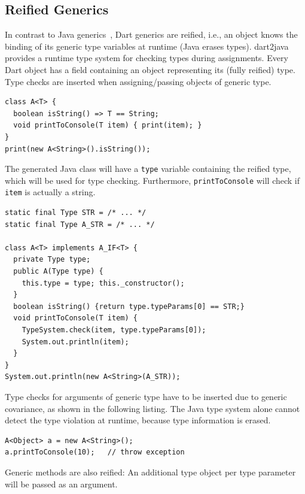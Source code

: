 \documentclass[sigplan,9pt]{acmart}
\begin{document}
\subsection{Reified Generics}
In contrast to Java generics~\cite{Bracha:1998:MFS:286936.286957}, Dart generics are reified, i.e., an object knows the binding of its generic type variables at runtime (Java erases types). dart2java provides a runtime type system for checking types during assignments. Every Dart object has a field containing an object representing its (fully reified) type. Type checks are inserted when assigning/passing objects of generic type. 

\begin{lstlisting}
class A<T> {
  boolean isString() => T == String;
  void printToConsole(T item) { print(item); }
}
print(new A<String>().isString());
\end{lstlisting}
The generated Java class will have a \texttt{type} variable containing the reified type, which will be used for type checking. Furthermore, \texttt{printToConsole} will check if \texttt{item} is actually a string. 
\begin{lstlisting}
static final Type STR = /* ... */
static final Type A_STR = /* ... */

class A<T> implements A_IF<T> {
  private Type type;
  public A(Type type) {
    this.type = type; this._constructor();
  }
  boolean isString() {return type.typeParams[0] == STR;}
  void printToConsole(T item) {
    TypeSystem.check(item, type.typeParams[0]);
    System.out.println(item);
  }
}
System.out.println(new A<String>(A_STR));
\end{lstlisting}
Type checks for arguments of generic type have to be inserted due to generic covariance, as shown in the following listing. The Java type system alone cannot detect the type violation at runtime, because type information is erased.
\begin{lstlisting}
A<Object> a = new A<String>();
a.printToConsole(10);	// throw exception
\end{lstlisting}
Generic methods are also reified: An additional type object per type parameter will be passed as an argument.
\end{document}
